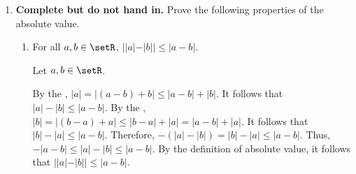 \begin{enumerate}
\begin{enumerate}
\begin{subprove}
      By the definition of union, $S \cup T = \sBUILD{x \in \setR}{x \in S \text{ or } x \in T}$.
      For any $x \in S \cup T$, by the definition of union, either $x \in S$ or $x \in T$.
      If $x \in S$, then by the definition of supremum, $x \leq \sup S$.
      If $x \in T$, then by the definition of supremum, $x \leq \sup T$.
      Since $M = \max \{\sup S, \sup T\}$, it follows that $\sup S \leq M$ and $\sup T \leq M$.
      Therefore, for any $x \in S \cup T$, $x \leq M$.
      By the definition of upper bound, $M$ is an  for $S \cup T$.
      
      Suppose that there exists an upper bound $u$ of $S \cup T$ such that $u < M$ for the sake of contradiction.
      By the definition of maximum, $M = \max \{\sup S, \sup T\}$ implies that either $M = \sup S$ or $M = \sup T$.
      Without loss of generality, assume $M = \sup S$.
      Then, $u < \sup S$.
      Since $u$ is an upper bound of $S \cup T$, by the definition of upper bound, $x \leq u$ for all $x \in S \cup T$.
      Since $S \subseteq S \cup T$, it follows that $x \leq u$ for all $x \in S$.
      Thus, $u$ is an upper bound of $S$.
      However, by the definition of supremum, since $\sup S$ is the least upper bound of $S$ and $u < \sup S$, this contradicts the fact that $\sup S$ is the least upper bound.
      Therefore, no such $u$ exists, and $M$ is the  of $S \cup T$.
      
      Therefore, $\sup (S \cup T) = M = \max \{\sup S, \sup T\}$.
    \end{subprove}
  \end{enumerate}












  \newpage
  \item \textbf{Complete but do not hand in.} Prove the following properties of the absolute value.
  \begin{enumerate}
    \item For all $a, b \in \setR$, $||a|-|b|| \leq |a-b|$.
    \begin{subprove}
      Let $a, b \in \setR$.
      
      By the , $|a| = |(a-b) + b| \leq |a-b| + |b|$.
      It follows that $|a| - |b| \leq |a-b|$.
      By the , $|b| = |(b-a) + a| \leq |b-a| + |a| = |a-b| + |a|$.
      It follows that $|b| - |a| \leq |a-b|$.
      Therefore, $-(|a| - |b|) = |b| - |a| \leq |a-b|$.
      Thus, $-|a-b| \leq |a| - |b| \leq |a-b|$.
      By the definition of absolute value, it follows that $||a| - |b|| \leq |a-b|$.
      

\end{subprove}
\end{enumerate}
\end{enumerate}
